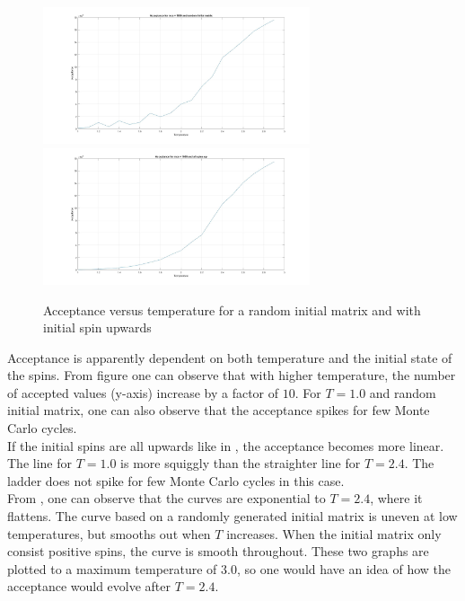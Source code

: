 \documentclass[10pt,a4paper]{article}
\begin{document}
\begin{figure}[H]
\centerline{
\includegraphics[width=0.7\textwidth]{acceptanceVStrandom}
\includegraphics[width=0.7\textwidth]{acceptanceVStupspin}
}
\caption{Acceptance versus temperature for a random initial matrix and with initial spin upwards}
\label{fig:acceptancetemp}
\end{figure}

\noindent Acceptance is apparently dependent on both temperature and the initial state of the spins. From figure  one can observe that with higher temperature, the number of accepted values (y-axis) increase by a factor of $10$. For $T = 1.0$ and random initial matrix, one can also observe that the acceptance spikes for few Monte Carlo cycles. 
\\
If the initial spins are all upwards like in , the acceptance becomes more linear. The line for $T = 1.0$ is more squiggly than the straighter line for $T = 2.4$. The ladder does not spike for few Monte Carlo cycles in this case.
\\
From , one can observe that the curves are exponential to $T = 2.4$, where it flattens. The curve based on a randomly generated initial matrix is uneven at low temperatures, but smooths out when $T$ increases. When the initial matrix only consist positive spins, the curve is smooth throughout. These two graphs are plotted to a maximum temperature of $3.0$, so one would have an idea of how the acceptance would evolve after $T = 2.4$. 
\end{document}
